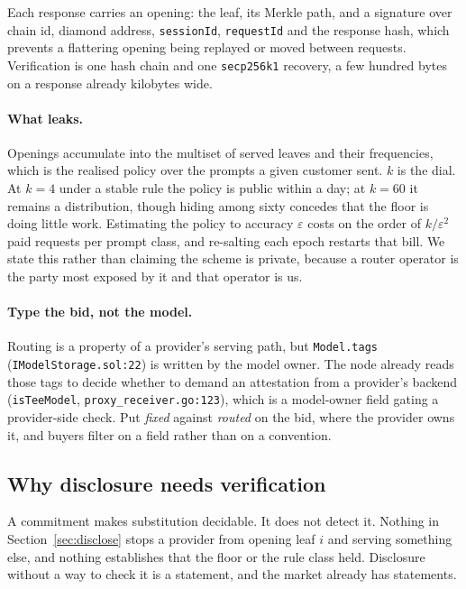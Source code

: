 \documentclass[11pt,a4paper]{article}
\newcommand{\code}[1]{\texttt{\small #1}}
\begin{document}
Each response carries an opening: the leaf, its Merkle path, and a signature
over chain id, diamond address, \code{sessionId}, \code{requestId} and the
response hash, which prevents a flattering opening being replayed or moved
between requests. Verification is one hash chain and one \code{secp256k1}
recovery, a few hundred bytes on a response already kilobytes wide.

\paragraph{What leaks.} Openings accumulate into the multiset of served leaves
and their frequencies, which is the realised policy over the prompts a given
customer sent. $k$ is the dial. At $k=4$ under a stable rule the policy is
public within a day; at $k=60$ it remains a distribution, though hiding among
sixty concedes that the floor is doing little work. Estimating the policy to
accuracy $\varepsilon$ costs on the order of $k/\varepsilon^{2}$ paid requests
per prompt class, and re-salting each epoch restarts that bill. We state this
rather than claiming the scheme is private, because a router operator is the
party most exposed by it and that operator is us.

\paragraph{Type the bid, not the model.} Routing is a property of a provider's
serving path, but \code{Model.tags} (\code{IModelStorage.sol:22}) is written by
the model owner. The node already reads those tags to decide whether to demand
an attestation from a provider's backend (\code{isTeeModel},
\code{proxy\_receiver.go:123}), which is a model-owner field gating a
provider-side check. Put \emph{fixed} against \emph{routed} on the bid, where
the provider owns it, and buyers filter on a field rather than on a convention.

\subsection{Why disclosure needs verification}
\label{sec:verify}

A commitment makes substitution decidable. It does not detect it. Nothing in
Section~\ref{sec:disclose} stops a provider from opening leaf $i$ and serving
something else, and nothing establishes that the floor or the rule class held.
Disclosure without a way to check it is a statement, and the market already has
statements.
\end{document}
